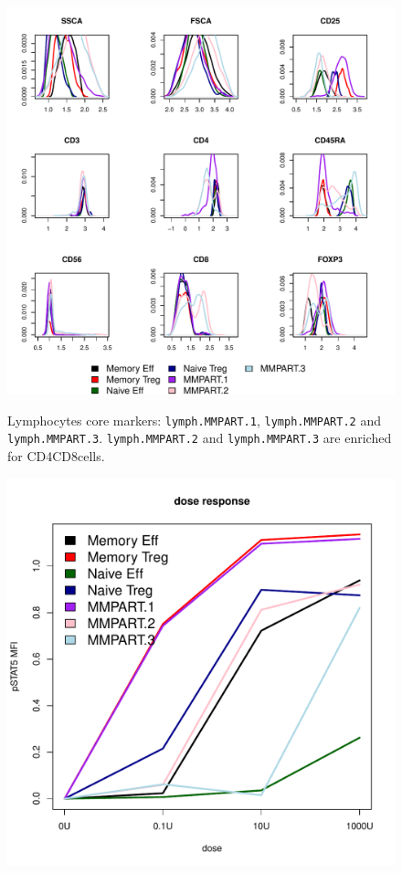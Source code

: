 %
\begin{figure}
\centering
\begin{minipage}{.9\textwidth}
\includegraphics[width=\linewidth]{figures/mmpart-lymphocytes-clusters}
\end{minipage}
{ Lymphocytes core markers: \texttt{lymph.MMPART.1}, \texttt{lymph.MMPART.2} and \texttt{lymph.MMPART.3}. }
{ \texttt{lymph.MMPART.2} and \texttt{lymph.MMPART.3} are enriched for CD4\negative CD8\positive cells.  }
%
\begin{minipage}{.5\textwidth}
  \includegraphics[width=\linewidth]{figures/mmpart-lymphocytes-dose-response}

\end{minipage}
\end{figure}
